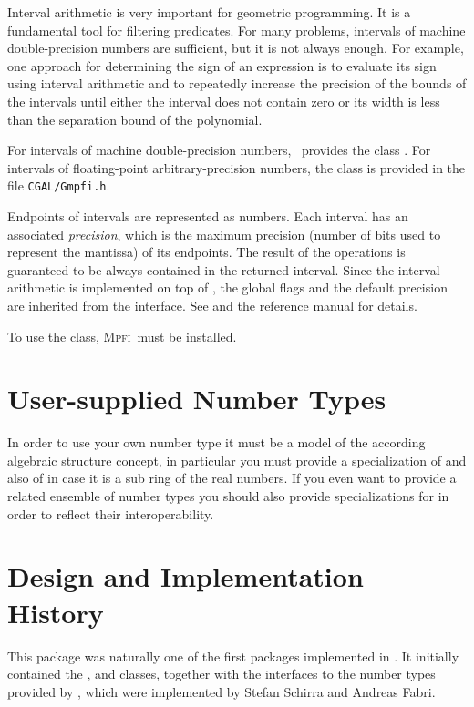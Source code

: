 Interval arithmetic is very important for geometric programming. It
is a fundamental tool for filtering predicates. For many problems,
intervals of machine double-precision numbers are sufficient, but it is
not always enough. For example, one approach for determining the sign of
an expression is to evaluate its sign using interval arithmetic and to
repeatedly increase the precision of the bounds of the intervals until
either the interval does not contain zero or its width is less than the
separation bound of the polynomial.

For intervals of machine double-precision numbers, \cgal~provides
the class . For intervals of floating-point
arbitrary-precision numbers, the class  is provided in the
file {\tt CGAL/Gmpfi.h}.

Endpoints of  intervals are represented as 
numbers.  Each interval has an associated \emph{precision}, which is
the maximum precision (number of bits used to represent the mantissa)
of its endpoints.  The result of the operations is guaranteed to be
always contained in the returned interval. Since the interval arithmetic
is implemented on top of , the global flags and the default
precision are inherited from the  interface. See
\cite{cgal:r-mpfi} and the  reference manual for details.

To use the  class, \textsc{Mpfi}\ must be installed.


\section{User-supplied Number Types}

In order to use your own number type it must be a model of the according
algebraic structure concept, in particular you must provide a 
specialization of  and also of
 in case it is a sub ring of the real numbers. 
If you even want to provide a related ensemble of number types you should also 
provide specializations for  in order to 
reflect their interoperability. 
 

\section{Design and Implementation History}

This package was naturally one of the first packages implemented in \cgal.
It initially contained the ,  and  classes,
together with the interfaces to the number types provided by \leda, which were
implemented by Stefan Schirra and Andreas Fabri.

